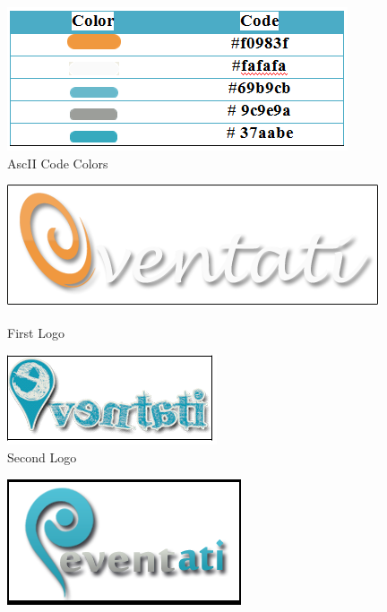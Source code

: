 \documentclass[12pt,a4paper,class,twoside,openany]{report}
\begin{document}
{\begin{figure}
\begin{center}
\includegraphics[height=1.5 in]{6-1}
\caption{AscII Code Colors}
\label{fg:6-1}
\end{center}
\end{figure}
 \begin{figure}[ht]
	\begin{minipage}[b]{0.5\linewidth}
	\centering
	\includegraphics[scale=.6]{6-2}
	\caption{First Logo }
	\label{fg:6-2}
	\end{minipage}
	\hspace{0.5cm}
	\begin{minipage}[b]{0.5\linewidth}
	\centering
	\includegraphics[width=\textwidth]{6-3}
	\caption{Second Logo}
	\label{fg:6-3}
	\end{minipage}
	\end{figure}
 \begin{figure}[ht]
	\begin{minipage}[b]{0.5\linewidth}
	\centering
	\includegraphics[scale=.6]{6-4}

\end{minipage}
\end{figure}}
\end{document}
